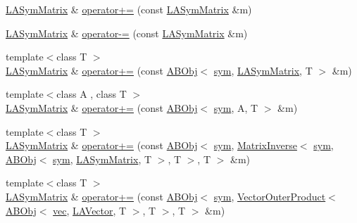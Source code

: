 \begin{DoxyCompactItemize}
\item 
\mbox{\hyperlink{classROOT_1_1Minuit2_1_1LASymMatrix}{L\+A\+Sym\+Matrix}} \& \mbox{\hyperlink{classROOT_1_1Minuit2_1_1LASymMatrix_a36e303de732b9277e57d27f91bb0d56a}{operator+=}} (const \mbox{\hyperlink{classROOT_1_1Minuit2_1_1LASymMatrix}{L\+A\+Sym\+Matrix}} \&m)
\item 
\mbox{\hyperlink{classROOT_1_1Minuit2_1_1LASymMatrix}{L\+A\+Sym\+Matrix}} \& \mbox{\hyperlink{classROOT_1_1Minuit2_1_1LASymMatrix_acbe82f35c3fc1df7ccda6ab505be41c2}{operator-\/=}} (const \mbox{\hyperlink{classROOT_1_1Minuit2_1_1LASymMatrix}{L\+A\+Sym\+Matrix}} \&m)
\item 
{\footnotesize template$<$class T $>$ }\\\mbox{\hyperlink{classROOT_1_1Minuit2_1_1LASymMatrix}{L\+A\+Sym\+Matrix}} \& \mbox{\hyperlink{classROOT_1_1Minuit2_1_1LASymMatrix_a72081bd71d3b9a665f3480310100eb51}{operator+=}} (const \mbox{\hyperlink{classROOT_1_1Minuit2_1_1ABObj}{A\+B\+Obj}}$<$ \mbox{\hyperlink{classROOT_1_1Minuit2_1_1sym}{sym}}, \mbox{\hyperlink{classROOT_1_1Minuit2_1_1LASymMatrix}{L\+A\+Sym\+Matrix}}, T $>$ \&m)
\item 
{\footnotesize template$<$class A , class T $>$ }\\\mbox{\hyperlink{classROOT_1_1Minuit2_1_1LASymMatrix}{L\+A\+Sym\+Matrix}} \& \mbox{\hyperlink{classROOT_1_1Minuit2_1_1LASymMatrix_a748a3aba1dc95fa7759e0383e85b9374}{operator+=}} (const \mbox{\hyperlink{classROOT_1_1Minuit2_1_1ABObj}{A\+B\+Obj}}$<$ \mbox{\hyperlink{classROOT_1_1Minuit2_1_1sym}{sym}}, A, T $>$ \&m)
\item 
{\footnotesize template$<$class T $>$ }\\\mbox{\hyperlink{classROOT_1_1Minuit2_1_1LASymMatrix}{L\+A\+Sym\+Matrix}} \& \mbox{\hyperlink{classROOT_1_1Minuit2_1_1LASymMatrix_a57fe61819895d7ff65c48767eb5b282e}{operator+=}} (const \mbox{\hyperlink{classROOT_1_1Minuit2_1_1ABObj}{A\+B\+Obj}}$<$ \mbox{\hyperlink{classROOT_1_1Minuit2_1_1sym}{sym}}, \mbox{\hyperlink{classROOT_1_1Minuit2_1_1MatrixInverse}{Matrix\+Inverse}}$<$ \mbox{\hyperlink{classROOT_1_1Minuit2_1_1sym}{sym}}, \mbox{\hyperlink{classROOT_1_1Minuit2_1_1ABObj}{A\+B\+Obj}}$<$ \mbox{\hyperlink{classROOT_1_1Minuit2_1_1sym}{sym}}, \mbox{\hyperlink{classROOT_1_1Minuit2_1_1LASymMatrix}{L\+A\+Sym\+Matrix}}, T $>$, T $>$, T $>$ \&m)
\item 
{\footnotesize template$<$class T $>$ }\\\mbox{\hyperlink{classROOT_1_1Minuit2_1_1LASymMatrix}{L\+A\+Sym\+Matrix}} \& \mbox{\hyperlink{classROOT_1_1Minuit2_1_1LASymMatrix_a2d453653e316685b846ddeb299708f3d}{operator+=}} (const \mbox{\hyperlink{classROOT_1_1Minuit2_1_1ABObj}{A\+B\+Obj}}$<$ \mbox{\hyperlink{classROOT_1_1Minuit2_1_1sym}{sym}}, \mbox{\hyperlink{classROOT_1_1Minuit2_1_1VectorOuterProduct}{Vector\+Outer\+Product}}$<$ \mbox{\hyperlink{classROOT_1_1Minuit2_1_1ABObj}{A\+B\+Obj}}$<$ \mbox{\hyperlink{classROOT_1_1Minuit2_1_1vec}{vec}}, \mbox{\hyperlink{classROOT_1_1Minuit2_1_1LAVector}{L\+A\+Vector}}, T $>$, T $>$, T $>$ \&m)

\end{DoxyCompactItemize}
